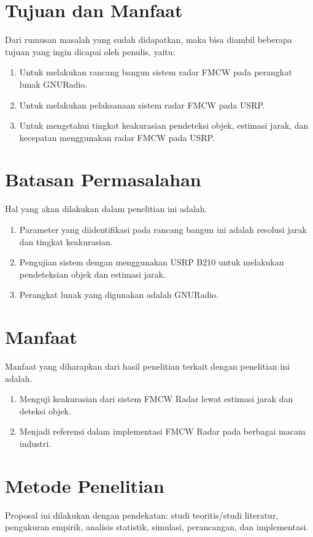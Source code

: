 \section{Tujuan dan Manfaat}
Dari rumusan masalah yang sudah didapatkan, maka bisa diambil beberapa tujuan yang ingin dicapai oleh penulis, yaitu:

\begin{enumerate}
	\item Untuk melakukan rancang bangun sistem radar FMCW pada perangkat lunak GNURadio.
	\item Untuk melakukan pelaksanaan sistem radar FMCW pada USRP.
	\item Untuk mengetahui tingkat keakurasian pendeteksi objek, estimasi jarak, dan kecepatan menggunakan radar FMCW pada USRP.
\end{enumerate}

\section{Batasan Permasalahan}
Hal yang akan dilakukan dalam penelitian ini adalah.
\begin{enumerate}
	\item Parameter yang diidentifikasi pada rancang bangun ini adalah resolusi jarak dan tingkat keakurasian.
	\item Pengujian sistem dengan menggunakan USRP B210 untuk melakukan pendeteksian objek dan estimasi jarak.
	\item Perangkat lunak yang digunakan adalah GNURadio.
\end{enumerate}

\section{Manfaat}
Manfaat yang diharapkan dari hasil penelitian terkait dengan penelitian ini adalah. 
\begin{enumerate}
	\item Menguji keakurasian dari sistem FMCW Radar lewat estimasi jarak dan deteksi objek.
	\item Menjadi referensi dalam implementasi FMCW Radar pada berbagai macam industri.
\end{enumerate}

\section{Metode Penelitian}
Proposal ini dilakukan dengan pendekatan: studi teoritis/studi literatur, pengukuran empirik, analisis statistik, simulasi, perancangan, dan implementasi.


